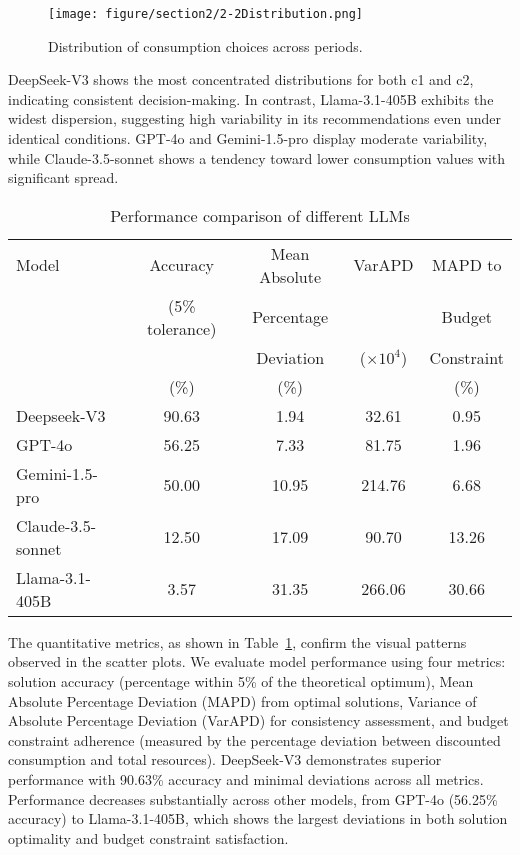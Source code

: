 \documentclass[12pt]{article}
\begin{document}
\begin{CJK*}{UTF8}{gbsn}
\begin{figure}[htbp]
    \centering
    \texttt{[image: figure/section2/2-2Distribution.png]}
    \caption{Distribution of consumption choices across periods.}
    \label{fig:distribution}
\end{figure}


DeepSeek-V3 shows the most concentrated distributions for both c1 and c2, indicating consistent decision-making. In contrast, Llama-3.1-405B exhibits the widest dispersion, suggesting high variability in its recommendations even under identical conditions. GPT-4o and Gemini-1.5-pro display moderate variability, while Claude-3.5-sonnet shows a tendency toward lower consumption values with significant spread.



\begin{table}[h]
\caption{Performance comparison of different LLMs}
\begin{tabular}{lcccc}
\hline
Model & Accuracy & Mean Absolute & VarAPD & MAPD to \\
& (5\% tolerance) & Percentage & & Budget \\
& & Deviation & ($\times 10^4$) & Constraint \\
& (\%) & (\%) & & (\%) \\
\hline
Deepseek-V3 & 90.63 & 1.94 & 32.61 & 0.95 \\
GPT-4o & 56.25 & 7.33 & 81.75 & 1.96 \\
Gemini-1.5-pro & 50.00 & 10.95 & 214.76 & 6.68 \\
Claude-3.5-sonnet & 12.50 & 17.09 & 90.70 & 13.26 \\
Llama-3.1-405B & 3.57 & 31.35 & 266.06 & 30.66 \\
\hline
\end{tabular}
\label{tab:metrics}
\end{table}

The quantitative metrics, as shown in Table~\ref{tab:metrics}, confirm the visual patterns observed in the scatter plots. We evaluate model performance using four metrics: solution accuracy (percentage within 5\% of the theoretical optimum), Mean Absolute Percentage Deviation (MAPD) from optimal solutions, Variance of Absolute Percentage Deviation (VarAPD) for consistency assessment, and budget constraint adherence (measured by the percentage deviation between discounted consumption and total resources). DeepSeek-V3 demonstrates superior performance with 90.63\% accuracy and minimal deviations across all metrics. Performance decreases substantially across other models, from GPT-4o (56.25\% accuracy) to Llama-3.1-405B, which shows the largest deviations in both solution optimality and budget constraint satisfaction.


\end{CJK*}
\end{document}
